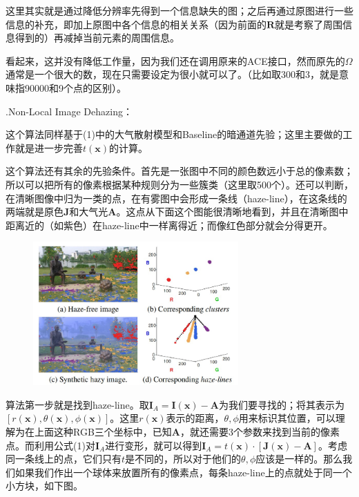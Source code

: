 \documentclass[12pt]{article}
\begin{document}
这里其实就是通过降低分辨率先得到一个信息缺失的图；之后再通过原图进行一些信息的补充，即加上原图中各个信息的相关关系（因为前面的$\bm{R}$就是考察了周围信息得到的）再减掉当前元素的周围信息。\par
看起来，这并没有降低工作量，因为我们还在调用原来的ACE接口，然而原先的$\Omega$通常是一个很大的数，现在只需要设定为很小就可以了。（比如取300和3，就是意味指90000和9个点的区别）。
\\

\begin{large}
    .Non-Local Image Dehazing：\par
\end{large}
这个算法同样基于(1)中的大气散射模型和Baseline的暗通道先验；这里主要做的工作就是进一步完善$t(\bm{x})$的计算。\par
这个算法还有其余的先验条件。首先是一张图中不同的颜色数远小于总的像素数；所以可以把所有的像素根据某种规则分为一些簇类（这里取500个）。还可以判断，在清晰图像中归为一类的点，在有雾图中会形成一条线（haze-line），在这条线的两端就是原色$\bm{J}$和大气光$\bm{A}$。这点从下面这个图能很清晰地看到，并且在清晰图中距离近的（如紫色）在haze-line中一样离得近；而像红色部分就会分得更开。
\newpage
\begin{figure}[h]
    \centering
    \includegraphics[width = 0.7\textwidth]{dip2.jpg}
\end{figure}
\par
算法第一步就是找到haze-line。取$\bm{I}_A=\bm{I}(\bm{x})-\bm{A}$为我们要寻找的；将其表示为$[r(\bm{x}), \theta(\bm{x}), \phi(\bm{x})]$。这里$r(\bm{x})$表示的距离，$\theta,\phi$用来标识其位置，可以理解为在上面这种RGB三个坐标中，已知$\bm{A}$，就还需要3个参数来找到当前的像素点。而利用公式(1)对$\bm{I}_A$进行变形，就可以得到$\bm{I}_A=  t(\bm{x}) · [\bm{J}(\bm{x}) − \bm{A}]$。考虑同一条线上的点，它们只有$t$是不同的，所以对于他们的$\theta,\phi$应该是一样的。那么我们如果我们作出一个球体来放置所有的像素点，每条haze-line上的点就处于同一个小方块，如下图。
\end{document}
